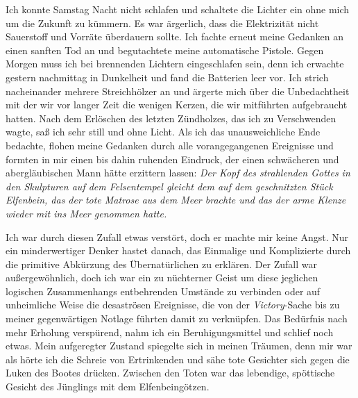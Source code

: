 \documentclass[a4paper]{memoir}
\begin{document}
Ich konnte Samstag Nacht nicht schlafen und schaltete die Lichter ein ohne mich um die Zukunft zu kümmern. Es war ärgerlich, dass die Elektrizität nicht Sauerstoff und Vorräte überdauern sollte. Ich fachte erneut meine Gedanken an einen sanften Tod an und begutachtete meine automatische Pistole. Gegen Morgen muss ich bei brennenden Lichtern eingeschlafen sein, denn ich erwachte gestern nachmittag in Dunkelheit und fand die Batterien leer vor. Ich strich nacheinander mehrere Streichhölzer an und ärgerte mich über die Unbedachtheit mit der wir vor langer Zeit die wenigen Kerzen, die wir mitführten aufgebraucht hatten.
Nach dem Erlöschen des letzten Zündholzes, das ich zu Verschwenden wagte, saß ich sehr still und ohne Licht. Als ich das unausweichliche Ende bedachte, flohen meine Gedanken durch alle vorangegangenen Ereignisse und formten in mir einen bis dahin ruhenden Eindruck, der einen schwächeren und abergläubischen Mann hätte erzittern lassen: \textit{Der Kopf des strahlenden Gottes in den Skulpturen auf dem Felsentempel gleicht dem auf dem geschnitzten Stück Elfenbein, das der tote Matrose aus dem Meer brachte und das der arme Klenze wieder mit ins Meer genommen hatte.}

Ich war durch diesen Zufall etwas verstört, doch er machte mir keine Angst. Nur ein minderwertiger Denker hastet danach, das Einmalige und Komplizierte durch die primitive Abkürzung des Übernatürlichen zu erklären. Der Zufall war außergewöhnlich, doch ich war ein zu nüchterner Geist um diese jeglichen logischen Zusammenhangs entbehrenden Umstände zu verbinden oder auf unheimliche Weise die desaströsen Ereignisse, die von der \textit{Victory}-Sache bis zu meiner gegenwärtigen Notlage führten damit zu verknüpfen. Das Bedürfnis nach mehr Erholung verspürend, nahm ich ein Beruhigungsmittel und schlief noch etwas. Mein aufgeregter Zustand spiegelte sich in meinen Träumen, denn mir war als hörte ich die Schreie von Ertrinkenden und sähe tote Gesichter sich gegen die Luken des Bootes drücken. Zwischen den Toten war das lebendige, spöttische Gesicht des Jünglings mit dem Elfenbeingötzen.
\end{document}
